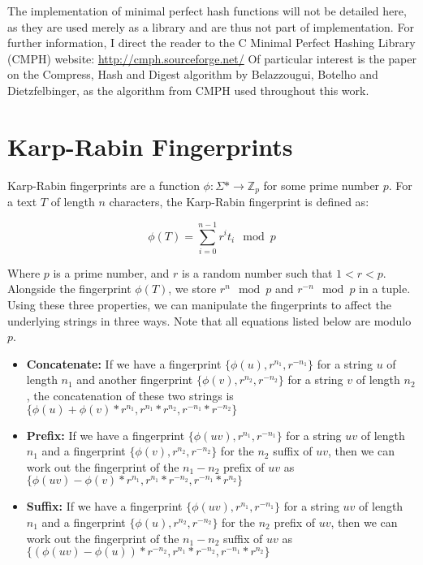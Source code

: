 \documentclass[ %
                    author={Dominic Joseph Moylett},
                supervisor={Dr. Raphael Clifford and Dr. Benjamin Sach},
                    degree={MEng},
                     title={Dictionary Matching with Fingerprints},
                  subtitle={An Empirical Analysis},
                      type={Research},
                      year={2014} ]{dissertation}
\begin{document}
The implementation of minimal perfect hash functions will not be detailed here, as they are used merely as a library and are thus not part of implementation. For further information, I direct the reader to the C Minimal Perfect Hashing Library (CMPH) website: \url{http://cmph.sourceforge.net/} Of particular interest is the paper on the Compress, Hash and Digest algorithm by Belazzougui, Botelho and Dietzfelbinger\cite{belazzougui:chd}, as the algorithm from CMPH used throughout this work.

\section{Karp-Rabin Fingerprints}

\noindent
Karp-Rabin fingerprints\cite{5390135} are a function $\phi : \Sigma* \to \mathbb{Z}_p$ for some prime number $p$. For a text $T$ of length $n$ characters, the Karp-Rabin fingerprint is defined as:

$$\phi(T) = \sum_{i = 0}^{n - 1} r^it_i \mod p$$

Where $p$ is a prime number, and $r$ is a random number such that $1 < r < p$. Alongside the fingerprint $\phi(T)$, we store $r^n \mod p$ and $r^{-n} \mod p$ in a tuple. Using these three properties, we can manipulate the fingerprints to affect the underlying strings in three ways\cite{5438620}. Note that all equations listed below are modulo $p$.

\begin{itemize}
  \item \textbf{Concatenate:} If we have a fingerprint $\{\phi(u), r^{n_1}, r^{-n_1}\}$ for a string $u$ of length $n_1$ and another fingerprint $\{\phi(v), r^{n_2}, r^{-n_2}\}$ for a string $v$ of length $n_2$, the concatenation of these two strings is $\{\phi(u) + \phi(v)*r^{n_1}, r^{n_1} * r^{n_2}, r^{-n_1} * r^{-n_2}\}$
  \item \textbf{Prefix:} If we have a fingerprint $\{\phi(uv), r^{n_1}, r^{-n_1}\}$ for a string $uv$ of length $n_1$ and a fingerprint $\{\phi(v), r^{n_2}, r^{-n_2}\}$ for the $n_2$ suffix of $uv$, then we can work out the fingerprint of the $n_1 - n_2$ prefix of $uv$ as $\{\phi(uv) - \phi(v)*r^{n_1}, r^{n_1} * r^{-n_2}, r^{-n_1} * r^{n_2}\}$
  \item \textbf{Suffix:} If we have a fingerprint $\{\phi(uv), r^{n_1}, r^{-n_1}\}$ for a string $uv$ of length $n_1$ and a fingerprint $\{\phi(u), r^{n_2}, r^{-n_2}\}$ for the $n_2$ prefix of $uv$, then we can work out the fingerprint of the $n_1 - n_2$ suffix of $uv$ as $\{(\phi(uv) - \phi(u))*r^{-n_2}, r^{n_1} * r^{-n_2}, r^{-n_1} * r^{n_2}\}$
\end{itemize}
\end{document}
